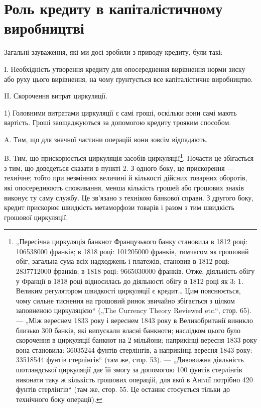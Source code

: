 
\section{Роль кредиту в капіталістичному виробництві}

Загальні зауваження, які ми досі зробили з приводу кредиту,
були такі:

I. Необхідність утворення кредиту для опосереднення вирівнення норми зиску або руху цього
вирівнення, на чому ґрунтується все капіталістичне виробництво.

II. Скорочення витрат циркуляції.

1) Головними витратами циркуляції є самі гроші, оскільки
вони самі мають вартість. Гроші заощаджуються за допомогою
кредиту трояким способом.

A. Тим, що для значної частини операцій вони зовсім відпадають.

B. Тим, що прискорюється циркуляція засобів циркуляції\footnote{
„Пересічна циркуляція банкнот Французького банку становила в 1812 році:
\num{106538000} франків; в 1818 році: \num{101205000} франків, тимчасом як грошовий обіг,
загальна сума всіх надходжень і платежів, становив в 1812 році: \num{2837712000}
франків; в 1818 році: \num{9665030000} франків. Отже, діяльність обігу у Франції
в 1818 році відносилась до діяльності обігу в 1812 році як 3: 1. Великим регулятором швидкості
циркуляції є кредит\dots{} Цим пояснюється, чому сильне тиснення на грошовий ринок звичайно збігається з
цілком заповненою циркуляцією“ („The Currency Theory Reviewed etc.“, стор. 65). — „Між вереснем 1833
року
і вереснем 1843 року в Великобританії виникло близько 300 банків, які випускали власні банкноти;
наслідком цього було скорочення в циркуляції банкнот
на 2 мільйони; наприкінці вересня 1833 року вона становила: \num{36035244} фунтів стерлінгів, а
наприкінці вересня 1843 року: \num{33518544} фунтів стерлінгів“
(там же, стор. 53). — „Дивовижна діяльність шотландської циркуляції дає їй
змогу за допомогою 100 фунтів стерлінгів виконати таку ж кількість грошових
операцій, для якої в Англії потрібно 420 фунтів стерлінгів“ (там же, стор. 55.
Це останнє стосується тільки до технічного боку операції).
}.
Почасти це збігається з тим, що доведеться сказати в пункті 2.
З одного боку, це прискорення — технічне; тобто при незмінних
величині й кількості дійсних товарних оборотів, які опосереднюють споживання, менша кількість грошей
або грошових знаків
виконує ту саму службу. Це зв’язано з технікою банкової справи.
З другого боку, кредит прискорює швидкість метаморфози товарів і разом з тим швидкість грошової
циркуляції.

